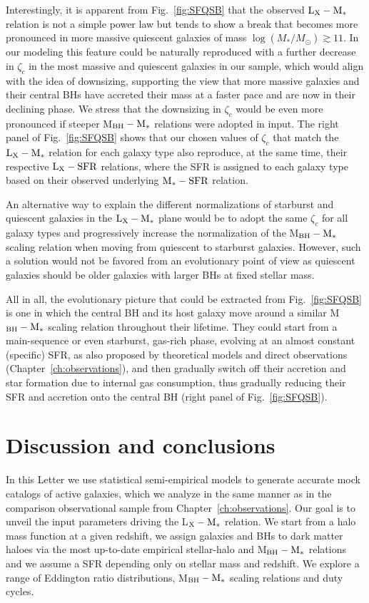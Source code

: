 Interestingly, it is apparent from Fig.~\ref{fig:SFQSB} that the observed ${\rm L}_{\rm X}-{\rm M}_*$ relation is not a simple power law but tends to show a break that becomes more pronounced in more massive quiescent galaxies of mass $\log (M_*/M_{\odot}) \gtrsim 11$. In our modeling this feature could be naturally reproduced with a further decrease in $\zeta_c$ in the most massive and quiescent galaxies in our sample, which would align with the idea of downsizing, supporting the view that more massive galaxies and their central BHs have accreted their mass at a faster pace and are now in their declining phase. We stress that the downsizing in $\zeta_c$ would be even more pronounced if steeper M$_{\rm BH}-{\rm M}_*$ relations were adopted in input. The right panel of Fig.~\ref{fig:SFQSB} shows that our chosen values of $\zeta_c$ that match the ${\rm L}_{\rm X}-{\rm M}_*$ relation for each galaxy type also reproduce, at the same time, their respective ${\rm L}_{\rm X}-{\rm SFR}$ relations, where the SFR is assigned to each galaxy type based on their observed underlying ${\rm M}_*-{\rm SFR}$ relation.

An alternative way to explain the different normalizations of starburst and quiescent galaxies in the ${\rm L}_{\rm X}-{\rm M}_*$ plane would be to adopt the same $\zeta_c$ for all galaxy types and progressively increase the normalization of the M$_{\rm BH}-{\rm M}_*$ scaling relation when moving from quiescent to starburst galaxies.  
However, such a solution would not be favored from an evolutionary point of view as quiescent galaxies should be older galaxies with larger BHs at fixed stellar mass.

All in all, the evolutionary picture that could be extracted from Fig.~\ref{fig:SFQSB} is one in which the central BH and its host galaxy move around a similar M$_{\rm BH}-{\rm M}_*$ scaling relation throughout their lifetime. They could start from a main-sequence or even starburst, gas-rich phase, evolving at an almost constant (specific) SFR, as also proposed by theoretical models \citep[e.g.][]{2014ApJ...782...69L, Aversa15} and direct observations (Chapter~\ref{ch:observations}), and then gradually switch off their accretion and star formation due to internal gas consumption, thus gradually reducing their SFR and accretion onto the central BH (right panel of Fig.~\ref{fig:SFQSB}).  

\section{Discussion and conclusions}\label{sec:disc_concl}
In this Letter we use statistical semi-empirical models to generate accurate mock catalogs of active galaxies, which we analyze in the same manner as in the comparison observational sample from Chapter~\ref{ch:observations}. Our goal is to unveil the input parameters driving the L$_{\rm X}-{\rm M}_*$ relation. We start from a halo mass function at a given redshift, we assign galaxies and BHs to dark matter haloes via the most up-to-date empirical stellar-halo and M$_{\rm BH}-{\rm M}_*$ relations and we assume a SFR depending only on stellar mass and redshift. We explore a range of Eddington ratio distributions, M$_{\rm BH}-{\rm M}_*$ scaling relations and duty cycles.

